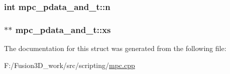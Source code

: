 \subsubsection[{n}]{\setlength{\rightskip}{0pt plus 5cm}int mpc\+\_\+pdata\+\_\+and\+\_\+t\+::n}\label{structmpc__pdata__and__t_a13785911263f8d35d1f8723486fef6c9}
\hypertarget{structmpc__pdata__and__t_afd16cf6554e0bf00c550a39fbb4ac640}{}
\subsubsection[{xs}]{$\ast$$\ast$ mpc\+\_\+pdata\+\_\+and\+\_\+t\+::xs}\label{structmpc__pdata__and__t_afd16cf6554e0bf00c550a39fbb4ac640}


The documentation for this struct was generated from the following file\+:\begin{DoxyCompactItemize}
\item 
F\+:/\+Fusion3\+D\+\_\+work/src/scripting/\hyperlink{mpc_8cpp}{mpc.\+cpp}\end{DoxyCompactItemize}
